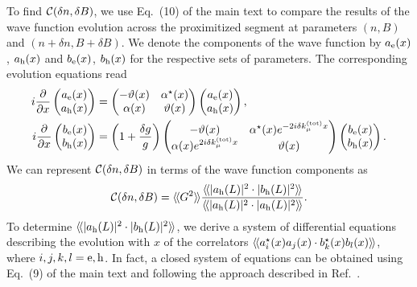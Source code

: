 \documentclass[pra,aps,a4paper,twocolumn,superscriptaddress,longbibliography]{revtex4-2}
\newcommand{\rngl}{\rangle\hspace{-0.05cm}\rangle}
\newcommand{\lngl}{\langle\hspace{-0.05cm}\langle}
\newcommand{\lprox}{L}
\begin{document}
To find ${\cal C}(\delta n, \delta B)$, we use Eq.~(10) of the main text to compare the results of the wave function evolution across the proximitized segment at parameters $(n, B)$ and $(n+\delta n, B + \delta B)$. We denote the components of the wave function by $a_{\rm e}(x)$, $a_{\rm h}(x)$ and $b_{\rm e}(x)$, $b_{\rm h}(x)$ for the respective sets of parameters.
The corresponding evolution equations read
\begin{align}\label{eq:evol}
    i \frac{\partial}{\partial x}
    \begin{pmatrix}
    a_{\rm e}(x)\\
    a_{\rm h}(x)
    \end{pmatrix}&=
    \begin{pmatrix}
    -\vartheta(x) & \alpha^\star(x)\\
    \alpha(x) & \vartheta(x)
    \end{pmatrix}
    \begin{pmatrix}
    a_{\rm e}(x)\\
    a_{\rm h}(x)
    \end{pmatrix},\\
    i \frac{\partial}{\partial x}
    \begin{pmatrix}
    b_{\rm e}(x)\\
    b_{\rm h}(x)
    \end{pmatrix}&=
    \left(1 + \frac{\delta g}{g}\right)
    \begin{pmatrix}
    -\vartheta(x) & \alpha^\star(x) e^{-2i\delta k^{\rm (tot)}_{\mu} x}\\
    \alpha(x) e^{2i\delta k^{\rm (tot)}_{\mu} x} & \vartheta(x)
    \end{pmatrix}
    \begin{pmatrix}
    b_{\rm e}(x)\\
    b_{\rm h}(x)
    \end{pmatrix}.\label{eq:evol2}
\end{align}
We can represent ${\cal C}(\delta n, \delta B)$ in terms of the wave function components as
\begin{equation}\label{eq:Cintermsofwf}
{\cal C}(\delta n, \delta B) = \lngl G^2 \rngl \frac{\lngl |a_{\rm h}(\lprox)|^2 \cdot |b_{\rm h}(\lprox)|^2\rngl}{\lngl |a_{\rm h}(\lprox)|^2 \cdot |a_{\rm h}(\lprox)|^2\rngl}.
\end{equation}
To determine $\lngl |a_{\rm h}(\lprox)|^2 \cdot |b_{\rm h}(\lprox)|^2\rngl$, we derive
a system of differential equations describing the evolution with $x$ of the correlators  $\lngl a_i^\star(x) a_j(x) \cdot b_k^\star(x) b_l(x) \rngl$, where $i,j,k,l = {\rm e, h}$. In fact, a closed system of equations can be obtained using Eq.~(9) of the main text and following the approach described in Ref.~\cite{ovchinnikov1980}.
\end{document}
